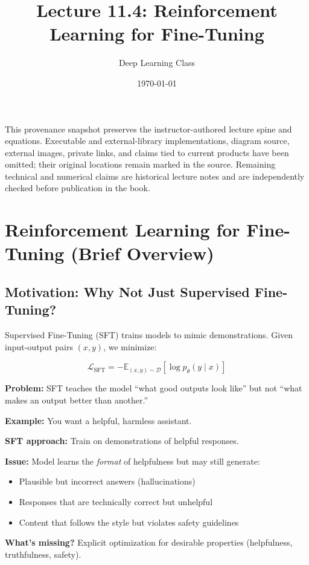 \documentclass{article}
\title{Lecture 11.4: Reinforcement Learning for Fine-Tuning}
\author{Deep Learning Class}
\date{\today}
\begin{document}
\maketitle

\begin{tcolorbox}[colback=gray!5!white, colframe=gray!60!black, title=Public Snapshot Boundary]
This provenance snapshot preserves the instructor-authored lecture spine and equations.
Executable and external-library implementations, diagram source, external images,
private links, and claims tied to current products have been omitted; their original
locations remain marked in the source. Remaining technical and numerical claims are
historical lecture notes and are independently checked before publication in the book.
\end{tcolorbox}

\section{Reinforcement Learning for Fine-Tuning (Brief Overview)}

\subsection{Motivation: Why Not Just Supervised Fine-Tuning?}

Supervised Fine-Tuning (SFT) trains models to mimic demonstrations. Given input-output pairs $(x, y)$, we minimize:

\begin{equation}
\mathcal{L}_{\text{SFT}} = -\mathbb{E}_{(x,y) \sim \mathcal{D}} \left[ \log p_\theta(y \mid x) \right]
\end{equation}

\textbf{Problem:} SFT teaches the model ``what good outputs look like'' but not ``what makes an output better than another.''

\begin{tcolorbox}[colback=yellow!5!white, colframe=orange!50!black, title=SFT Limitations]
\textbf{Example:} You want a helpful, harmless assistant.

\textbf{SFT approach:} Train on demonstrations of helpful responses.

\textbf{Issue:} Model learns the \textit{format} of helpfulness but may still generate:
\begin{itemize}
\item Plausible but incorrect answers (hallucinations)
\item Responses that are technically correct but unhelpful
\item Content that follows the style but violates safety guidelines
\end{itemize}

\textbf{What's missing?} Explicit optimization for desirable properties (helpfulness, truthfulness, safety).
\end{tcolorbox}
\end{document}
